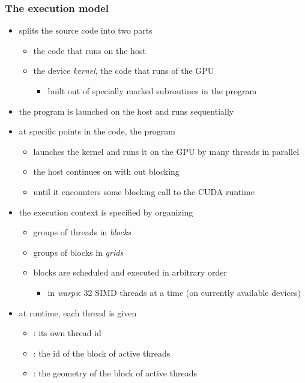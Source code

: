 \begin{frame}[fragile]
%
  \frametitle{The execution model}
%
  \begin{itemize}
%
  \item {} splits the source code into two parts
    \begin{itemize}
    \item the code that runs on the host
    \item the device {\em kernel}, the code that runs of the GPU 
      \begin{itemize}
      \item built out of specially marked subroutines in the program
      \end{itemize}
    \end{itemize}
  \item the program is launched on the host and runs sequentially
  \item at specific points in the code, the program
    \begin{itemize}
    \item launches the kernel and runs it on the GPU by many threads in parallel
    \item the host continues on with out blocking 
    \item until it encounters some blocking call to the CUDA runtime
    \end{itemize}
%
  \item the execution context is specified by organizing
    \begin{itemize}
    \item groups of threads in {\em blocks}
    \item groups of blocks in {\em grids}
    \item blocks are scheduled and executed in arbitrary order
      \begin{itemize}
      \item in {\em warps}: 32 SIMD threads at a time (on currently available devices)
      \end{itemize}
    \end{itemize}
%
  \item at runtime, each thread is given
    \begin{itemize}
    \item {}: its own thread id
    \item {}: the id of the block of active threads
    \item {}: the geometry of the block of active threads
    \end{itemize}
%
  \end{itemize}
%
\end{frame}

